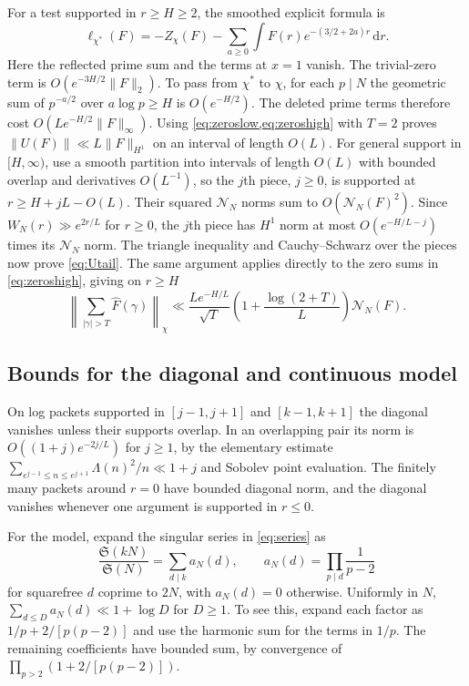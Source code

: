 \documentclass[11pt,a4paper]{article}
\numberwithin{equation}{section}
\newcommand{\SSS}{\mathfrak S}
\newcommand{\ud}{\mathrm d}
\newcommand{\NN}{\mathcal N_N}
\begin{document}
For a test supported in $r\ge H\ge2$, the smoothed explicit
formula \cite[Section~16.1]{Helfgott} is
\begin{equation}
 \ell_{\chi^*}(F)=-Z_\chi(F)
       -\sum_{a\ge0}\int F(r)e^{-(3/2+2a)r}\,\ud r .
 \label{eq:poslogexplicit}
\end{equation}
Here the reflected prime sum and the terms at $x=1$ vanish.
The trivial-zero term is $O(e^{-3H/2}\|F\|_2)$.
To pass from $\chi^*$ to $\chi$, for each $p\mid N$ the
geometric sum of $p^{-a/2}$ over $a\log p\ge H$ is
$O(e^{-H/2})$. The deleted prime terms therefore cost
$O(L e^{-H/2}\|F\|_\infty)$.
Using \cref{eq:zeroslow,eq:zeroshigh} with $T=2$ proves
$\|U(F)\|\ll L\|F\|_{H^1}$ on an interval of length $O(L)$.
For general support in $[H,\infty)$, use a smooth partition into
intervals of length $O(L)$ with bounded overlap and derivatives
$O(L^{-1})$, so the $j$th piece, $j\ge0$, is supported at
$r\ge H+jL-O(L)$. Their squared $\NN$ norms sum to $O(\NN(F)^2)$.
Since $W_N(r)\gg e^{2r/L}$ for $r\ge0$, the $j$th piece has
$H^1$ norm at most $O(e^{-H/L-j})$ times its $\NN$ norm.
The triangle inequality and Cauchy--Schwarz over the pieces now
prove \cref{eq:Utail}. The same argument applies directly to
the zero sums in \cref{eq:zeroshigh}, giving on $r\ge H$
\begin{equation}
 \left\|\sum_{|\gamma|>T}\widehat F(\gamma)\right\|_\chi
     \ll \frac{L e^{-H/L}}{\sqrt T}
         \left(1+\frac{\log(2+T)}{L}\right)\NN(F).
 \label{eq:globalzeroshigh}
\end{equation}

\subsection{Bounds for the diagonal and continuous model}

On log packets supported in $[j-1,j+1]$ and $[k-1,k+1]$ the diagonal
vanishes unless their supports overlap. In an overlapping pair its
norm is $O((1+j)e^{-2j/L})$ for $j\ge1$, by the elementary estimate
$\sum_{e^{j-1}\le n\le e^{j+1}}\Lambda(n)^2/n\ll 1+j$ and Sobolev
point evaluation. The finitely many packets around $r=0$ have
bounded diagonal norm, and the diagonal vanishes whenever one
argument is supported in $r\le0$.

For the model, expand the singular series in \cref{eq:series} as
\[
   \frac{\SSS(kN)}{\SSS(N)}
     =\sum_{d\mid k} a_N(d),\qquad
   a_N(d)=\prod_{p\mid d}\frac1{p-2}
\]
for squarefree $d$ coprime to $2N$, with $a_N(d)=0$ otherwise.
Uniformly in $N$, $\sum_{d\le D}a_N(d)\ll 1+\log D$ for $D\ge1$.
To see this, expand each factor as
$1/p+2/[p(p-2)]$ and use the harmonic sum for the terms in $1/p$.
The remaining coefficients have bounded sum, by convergence of
$\prod_{p>2}(1+2/[p(p-2)])$.
\end{document}
